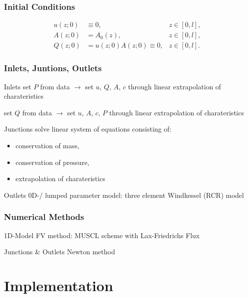 \documentclass{beamer}
\begin{document}
\begin{frame}
	\frametitle{Initial Conditions}
	\begin{align}
		u(z;0) &\equiv 0, &z \in [0,l],\\
		A(z;0) &= A_0(z), &z \in [0,l], \\
		Q(z;0) &= u(z;0)A(z;0) \equiv 0, &z \in [0,l].
	\end{align}
	\vspace{5mm}
\end{frame}
\begin{frame}
	\frametitle{Inlets, Juntions, Outlets}
	\begin{block}{Inlets}
		set $P$ from data $\rightarrow$ set $u$, $Q$, $A$, $c$ through linear extrapolation of charateristics

		set $Q$ from data $\rightarrow$ set $u$, $A$, $c$, $P$ through linear extrapolation of charateristics
	\end{block}
	\begin{block}{Junctions}
	solve linear system of equations consisting of:
	\begin{itemize}
		\item conservation of mass, 
		\item conservation of pressure, 
		\item extrapolation of charateristics	
	\end{itemize}
\end{block}
\begin{block}{Outlets}
	0D-/ lumped parameter model: three element Windkessel (RCR) model 
\end{block}
\end{frame}
\begin{frame}
	\frametitle{Numerical Methods}
	\begin{block}{1D-Model}
		FV method: MUSCL scheme with Lax-Friedrichs Flux
	\end{block}
	\begin{block}{Junctions \& Outlets}
		Newton method
	\end{block}


\end{frame}

\section{Implementation}
\end{document}
